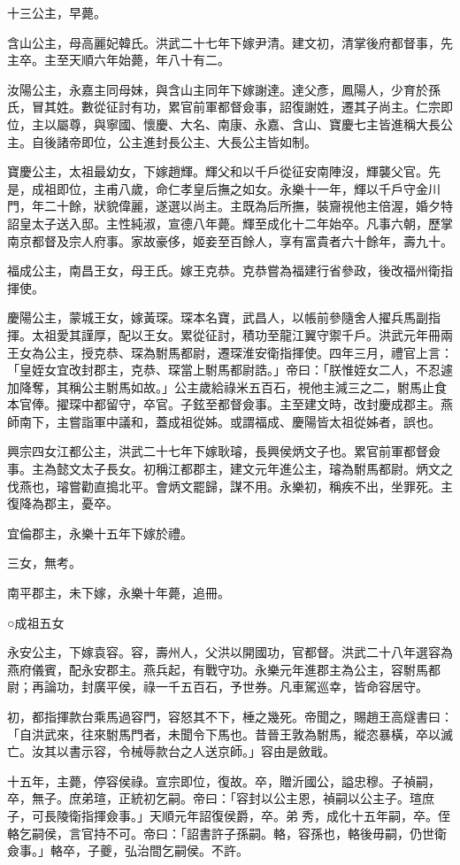 十三公主，早薨。

含山公主，母高麗妃韓氏。洪武二十七年下嫁尹清。建文初，清掌後府都督事，先主卒。主至天順六年始薨，年八十有二。

汝陽公主，永嘉主同母妹，與含山主同年下嫁謝達。達父彥，鳳陽人，少育於孫氏，冒其姓。數從征討有功，累官前軍都督僉事，詔復謝姓，遷其子尚主。仁宗即位，主以屬尊，與寧國、懷慶、大名、南康、永嘉、含山、寶慶七主皆進稱大長公主。自後諸帝即位，公主進封長公主、大長公主皆如制。

寶慶公主，太祖最幼女，下嫁趙輝。輝父和以千戶從征安南陣沒，輝襲父官。先是，成祖即位，主甫八歲，命仁孝皇后撫之如女。永樂十一年，輝以千戶守金川門，年二十餘，狀貌偉麗，遂選以尚主。主既為后所撫，裝齎視他主倍渥，婚夕特詔皇太子送入邸。主性純淑，宣德八年薨。輝至成化十二年始卒。凡事六朝，歷掌南京都督及宗人府事。家故豪侈，姬妾至百餘人，享有富貴者六十餘年，壽九十。

福成公主，南昌王女，母王氏。嫁王克恭。克恭嘗為福建行省參政，後改福州衛指揮使。

慶陽公主，蒙城王女，嫁黃琛。琛本名寶，武昌人，以帳前參隨舍人擢兵馬副指揮。太祖愛其謹厚，配以王女。累從征討，積功至龍江翼守禦千戶。洪武元年冊兩王女為公主，授克恭、琛為駙馬都尉，遷琛淮安衛指揮使。四年三月，禮官上言：「皇姪女宜改封郡主，克恭、琛當上駙馬都尉誥。」帝曰：「朕惟姪女二人，不忍遽加降奪，其稱公主駙馬如故。」公主歲給祿米五百石，視他主減三之二，駙馬止食本官俸。擢琛中都留守，卒官。子鉉至都督僉事。主至建文時，改封慶成郡主。燕師南下，主嘗詣軍中議和，蓋成祖從姊。或謂福成、慶陽皆太祖從姊者，誤也。

興宗四女江都公主，洪武二十七年下嫁耿璿，長興侯炳文子也。累官前軍都督僉事。主為懿文太子長女。初稱江都郡主，建文元年進公主，璿為駙馬都尉。炳文之伐燕也，璿嘗勸直搗北平。會炳文罷歸，謀不用。永樂初，稱疾不出，坐罪死。主復降為郡主，憂卒。

宜倫郡主，永樂十五年下嫁於禮。

三女，無考。

南平郡主，未下嫁，永樂十年薨，追冊。

○成祖五女

永安公主，下嫁袁容。容，壽州人，父洪以開國功，官都督。洪武二十八年選容為燕府儀賓，配永安郡主。燕兵起，有戰守功。永樂元年進郡主為公主，容駙馬都尉；再論功，封廣平侯，祿一千五百石，予世券。凡車駕巡幸，皆命容居守。

初，都指揮款台乘馬過容門，容怒其不下，棰之幾死。帝聞之，賜趙王高燧書曰：「自洪武來，往來駙馬門者，未聞令下馬也。昔晉王敦為駙馬，縱恣暴橫，卒以滅亡。汝其以書示容，令械辱款台之人送京師。」容由是斂戢。

十五年，主薨，停容侯祿。宣宗即位，復故。卒，贈沂國公，謚忠穆。子禎嗣，卒，無子。庶弟瑄，正統初乞嗣。帝曰：「容封以公主恩，禎嗣以公主子。瑄庶子，可長陵衛指揮僉事。」天順元年詔復侯爵，卒。弟秀，成化十五年嗣，卒。侄輅乞嗣侯，言官持不可。帝曰：「詔書許子孫嗣。輅，容孫也，輅後毋嗣，仍世衛僉事。」輅卒，子夔，弘治間乞嗣侯。不許。

